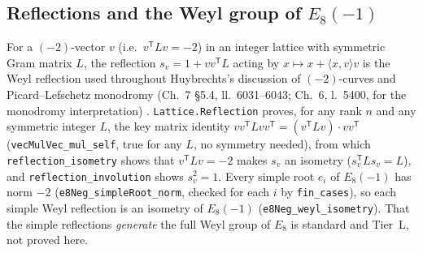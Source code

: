 \documentclass[11pt,a4paper]{article}
\theoremstyle{remark}
\begin{document}
\subsection{Reflections and the Weyl group of $E_8(-1)$}
For a $(-2)$-vector $v$ (i.e.\ $v^{\mathsf T}Lv=-2$) in an integer lattice with symmetric Gram
matrix $L$, the reflection $s_v=1+vv^{\mathsf T}L$ acting by $x\mapsto x+\langle x,v\rangle v$ is
the Weyl reflection used throughout Huybrechts's discussion of $(-2)$-curves and Picard--Lefschetz
monodromy (Ch.~7 \S5.4, ll.~6031--6043; Ch.~6, l.~5400, for the monodromy interpretation)
\cite{Huybrechts}. \texttt{Lattice.Reflection} proves, for any rank $n$ and any symmetric integer
$L$, the key matrix identity $vv^{\mathsf T}Lvv^{\mathsf T}=(v^{\mathsf T}Lv)\cdot vv^{\mathsf T}$
(\texttt{vecMulVec\_mul\_self}, true for any $L$, no symmetry needed), from which
\texttt{reflection\_isometry} shows that $v^{\mathsf T}Lv=-2$ makes $s_v$ an isometry
($s_v^{\mathsf T}Ls_v=L$), and \texttt{reflection\_involution} shows $s_v^2=1$. Every simple root
$e_i$ of $E_8(-1)$ has norm $-2$ (\texttt{e8Neg\_simpleRoot\_norm}, checked for each $i$ by
\texttt{fin\_cases}), so each simple Weyl reflection is an isometry of $E_8(-1)$
(\texttt{e8Neg\_weyl\_isometry}). That the simple reflections \emph{generate} the full Weyl group
of $E_8$ is standard and Tier~L, not proved here.
\end{document}
